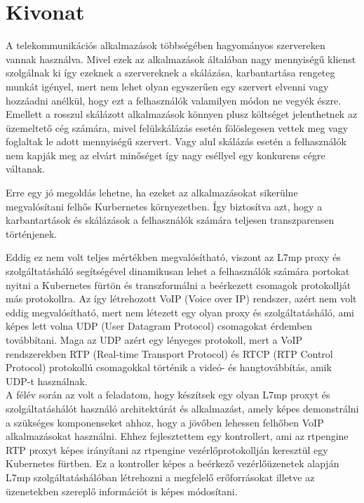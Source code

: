 \setcounter{page}{1}

\selecthungarian

\chapter*{Kivonat}

A telekommunikációs alkalmazások többségében hagyományos szervereken vannak
használva. Mivel ezek az alkalmazások általában nagy mennyiségű klienst szolgálnak 
ki így ezeknek a szervereknek a skálázása, karbantartása rengeteg munkát igényel,
mert nem lehet olyan egyszerűen egy szervert elvenni vagy hozzáadni anélkül, hogy
ezt a felhasználók valamilyen módon ne vegyék észre. Emellett a rosszul skálázott 
alkalmazások könnyen plusz költséget jelenthetnek az üzemeltető cég számára, mivel 
felülskálázás esetén fölöslegesen vettek meg vagy foglaltak le adott mennyiségű 
szervert. Vagy alul skálázás esetén a felhasználók nem kapják meg az elvárt minőséget
így nagy eséllyel egy konkurens cégre váltanak. 

Erre egy jó megoldás lehetne, ha ezeket az alkalmazásokat sikerülne megvalósítani
felhős Kurbernetes környezetben. Így biztosítva azt, hogy a karbantartások és
skálázások a felhasználók számára teljesen transzparensen történjenek.

Eddig ez nem volt teljes mértékben megvalósítható, viszont az L7mp proxy és 
szolgáltatásháló segítségével dinamikusan lehet a felhasználók számára portokat
nyitni a Kubernetes fürtön és transzformálni a beérkezett csomagok protokollját 
más protokollra. Az így létrehozott VoIP (Voice over IP) rendszer, azért nem volt eddig megvalósítható, mert nem létezett egy olyan
proxy és szolgáltatásháló, ami képes lett volna UDP (User Datagram Protocol) 
csomagokat érdemben továbbítani. Maga az UDP azért egy lényeges protokoll, mert a 
VoIP rendszerekben RTP (Real-time Transport Protocol) és 
RTCP (RTP Control Protocol) protokollú csomagokkal történik a videó- és 
hangtovábbítás, amik UDP-t használnak. \\

A félév során az volt a feladatom, hogy készítsek egy olyan L7mp proxyt és 
szolgáltatáshálót használó architektúrát és alkalmazást, amely képes demonstrálni
a szükséges komponenseket ahhoz, hogy a jövőben lehessen felhőben VoIP 
alkalmazásokat használni. Ehhez fejlesztettem egy kontrollert, ami az rtpengine
RTP proxyt képes irányítani az rtpengine vezérlőprotokollján keresztül egy
Kubernetes fürtben. Ez a kontroller képes a beérkező vezérlőüzenetek alapján 
L7mp szolgáltatáshálóban létrehozni a megfelelő erőforrásokat illetve az üzenetekben
szereplő információt is képes módosítani. 

